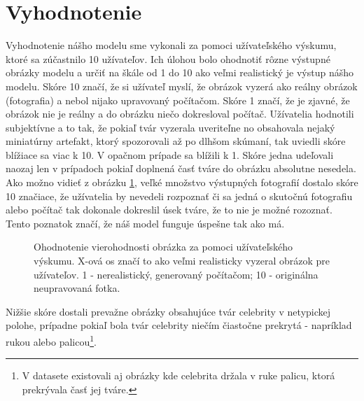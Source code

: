 \documentclass [11pt, a4paper]{article}
\begin{document}
	
	\section{Vyhodnotenie}
	Vyhodnotenie nášho modelu sme vykonali za pomoci užívateľského výskumu, ktoré sa zúčastnilo 10 užívateľov. Ich úlohou bolo ohodnotiť rôzne výstupné obrázky modelu a určiť na škále od 1 do 10 ako veľmi realistický je výstup nášho modelu. Skóre 10 značí, že si užívateľ myslí, že obrázok vyzerá ako reálny obrázok (fotografia) a nebol nijako upravovaný počítačom. Skóre 1 značí, že je zjavné, že obrázok nie je reálny a do obrázku niečo dokresloval počítač. Užívatelia hodnotili subjektívne a to tak, že pokiaľ tvár vyzerala uveriteľne no obsahovala nejaký miniatúrny artefakt, ktorý spozorovali až po dlhšom skúmaní, tak uviedli skóre blížiace sa viac k 10. V opačnom prípade sa blížili k 1. Skóre jedna udeľovali naozaj len v prípadoch pokiaľ doplnená časť tváre do obrázku absolutne nesedela. Ako možno vidieť z obrázku \ref{user_research}, veľké množstvo výstupných fotografií dostalo skóre 10 značiace, že užívatelia by nevedeli rozpoznať či sa jedná o skutočnú fotografiu alebo počítač tak dokonale dokreslil úsek tváre, že to nie je možné rozoznať. Tento poznatok značí, že náš model funguje úspešne tak ako má.
	
	\begin{figure}[h!]
		\begin{center}
			\caption{Ohodnotenie vierohodnosti obrázka za pomoci užívateľského výskumu. X-ová os značí to ako veľmi realisticky vyzeral obrázok pre užívateľov. 1 - nerealistický, generovaný počítačom; 10 - originálna neupravovaná fotka.}
			\label{user_research}
		\end{center}
	\end{figure}
	
	Nižšie skóre dostali prevažne obrázky obsahujúce tvár celebrity v netypickej polohe, prípadne pokiaľ bola tvár celebrity niečím čiastočne prekrytá - napríklad rukou alebo palicou\footnote{V datasete existovali aj obrázky kde celebrita držala v ruke palicu, ktorá prekrývala časť jej tváre.}.
	
\end{document}
